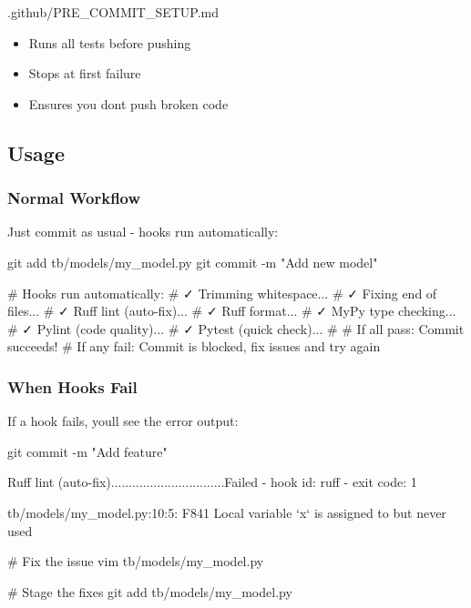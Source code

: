 \begin{relocated}{.github/PRE_COMMIT_SETUP.md}
\begin{enumerate}
  \begin{itemize}
  \tightlist
  \item
    Runs all tests before pushing
  \item
    Stops at first failure
  \item
    Ensures you don\textquotesingle t push broken code
  \end{itemize}
\end{enumerate}

\subsection{Usage}\label{um:flow:pre-commit-setup:usage}

\subsubsection{Normal Workflow}\label{um:flow:pre-commit-setup:normal-workflow}

Just commit as usual - hooks run automatically:

\begin{textblock}
git add tb/models/my_model.py
git commit -m "Add new model"

# Hooks run automatically:
# ✓ Trimming whitespace...
# ✓ Fixing end of files...
# ✓ Ruff lint (auto-fix)...
# ✓ Ruff format...
# ✓ MyPy type checking...
# ✓ Pylint (code quality)...
# ✓ Pytest (quick check)...
#
# If all pass: Commit succeeds!
# If any fail: Commit is blocked, fix issues and try again
\end{textblock}

\subsubsection{When Hooks Fail}\label{um:flow:pre-commit-setup:when-hooks-fail}

If a hook fails, you\textquotesingle ll see the error output:

\begin{textblock}
git commit -m "Add feature"

Ruff lint (auto-fix)................................Failed
- hook id: ruff
- exit code: 1

tb/models/my_model.py:10:5: F841 Local variable `x` is assigned to but never used

# Fix the issue
vim tb/models/my_model.py

# Stage the fixes
git add tb/models/my_model.py


\end{textblock}
\end{relocated}
